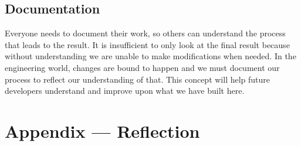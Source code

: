 \documentclass{article}
\begin{document}
\subsection{Documentation}
Everyone needs to document their work, so others can understand the process that leads to the result. It is insufficient to only look at the final result because without understanding we are unable to make modifications when needed. In the engineering world, changes are bound to happen and we must document our process to reflect our understanding of that. This concept will help future developers understand and improve upon what we have built here.

\newpage{}

\section*{Appendix --- Reflection}
\end{document}
